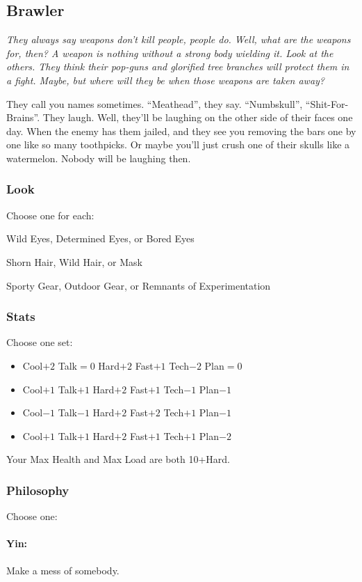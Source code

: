 \subsection{Brawler}
{\itshape They always say weapons don't kill people, people do. Well,
  what are the weapons for, then? A weapon is nothing without a strong
  body wielding it. Look at the others. They think their pop-guns and
  glorified tree branches will protect them in a fight. Maybe, but
  where will they be when those weapons are taken away?

They call you names sometimes. ``Meathead'', they say. ``Numbskull'',
``Shit-For-Brains''. They laugh. Well, they'll be laughing on the
other side of their faces one day. When the enemy has them jailed, and
they see you removing the bars one by one like so many toothpicks. Or
maybe you'll just crush one of their skulls like a watermelon. Nobody
will be laughing then.}

\subsubsection{Look}
Choose one for each:

Wild Eyes, Determined Eyes, or Bored Eyes

Shorn Hair, Wild Hair, or Mask

Sporty Gear, Outdoor Gear, or Remnants of Experimentation

\subsubsection{Stats}
Choose one set:
\begin{itemize}
\setlength\itemsep{0em}
\item Cool$+2$ Talk${=}0$ Hard$+2$ Fast$+1$ Tech$-2$ Plan${=}0$
\item Cool$+1$ Talk$+1$ Hard$+2$ Fast$+1$ Tech$-1$ Plan$-1$
\item Cool$-1$ Talk$-1$ Hard$+2$ Fast$+2$ Tech$+1$ Plan$-1$
\item Cool$+1$ Talk$+1$ Hard$+2$ Fast$+1$ Tech$+1$ Plan$-2$
\end{itemize}

Your Max Health and Max Load are both 10+Hard.

\subsubsection{Philosophy}
Choose one:
\paragraph{Yin:} Make a mess of somebody.
